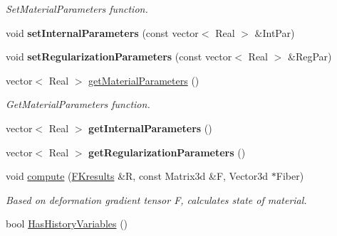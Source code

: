 \begin{DoxyCompactItemize}
\begin{DoxyCompactList}\small\item\em SetMaterialParameters function. \item\end{DoxyCompactList}\item 
\hypertarget{classvoom_1_1_pass_myo_a_a413a68f64bd4b31f7f31762b371ce168}{
void {\bfseries setInternalParameters} (const vector$<$ Real $>$ \&IntPar)}
\label{classvoom_1_1_pass_myo_a_a413a68f64bd4b31f7f31762b371ce168}

\item 
\hypertarget{classvoom_1_1_pass_myo_a_afd21cbc27fb5bdb9c13b476fb9d31e71}{
void {\bfseries setRegularizationParameters} (const vector$<$ Real $>$ \&RegPar)}
\label{classvoom_1_1_pass_myo_a_afd21cbc27fb5bdb9c13b476fb9d31e71}

\item 
\hypertarget{classvoom_1_1_pass_myo_a_a63cdaa267f12644f0bfb370e8edb437a}{
vector$<$ Real $>$ \hyperlink{classvoom_1_1_pass_myo_a_a63cdaa267f12644f0bfb370e8edb437a}{getMaterialParameters} ()}
\label{classvoom_1_1_pass_myo_a_a63cdaa267f12644f0bfb370e8edb437a}

\begin{DoxyCompactList}\small\item\em GetMaterialParameters function. \item\end{DoxyCompactList}\item 
\hypertarget{classvoom_1_1_pass_myo_a_a8c64a85541b9b3d7ddfbc2af457c6f7d}{
vector$<$ Real $>$ {\bfseries getInternalParameters} ()}
\label{classvoom_1_1_pass_myo_a_a8c64a85541b9b3d7ddfbc2af457c6f7d}

\item 
\hypertarget{classvoom_1_1_pass_myo_a_a21875f4e7fcc512d2a7d1e82d9528d02}{
vector$<$ Real $>$ {\bfseries getRegularizationParameters} ()}
\label{classvoom_1_1_pass_myo_a_a21875f4e7fcc512d2a7d1e82d9528d02}

\item 
\hypertarget{classvoom_1_1_pass_myo_a_a84ba0b39e64dd29fbb3790c3857fcb2d}{
void \hyperlink{classvoom_1_1_pass_myo_a_a84ba0b39e64dd29fbb3790c3857fcb2d}{compute} (\hyperlink{structvoom_1_1_mechanics_material_1_1_f_kresults}{FKresults} \&R, const Matrix3d \&F, Vector3d $\ast$Fiber)}
\label{classvoom_1_1_pass_myo_a_a84ba0b39e64dd29fbb3790c3857fcb2d}

\begin{DoxyCompactList}\small\item\em Based on deformation gradient tensor F, calculates state of material. \item\end{DoxyCompactList}\item 
\hypertarget{classvoom_1_1_pass_myo_a_a06cf31fdeb3e84c3aa7553928bcf3b01}{
bool \hyperlink{classvoom_1_1_pass_myo_a_a06cf31fdeb3e84c3aa7553928bcf3b01}{HasHistoryVariables} ()}
\label{classvoom_1_1_pass_myo_a_a06cf31fdeb3e84c3aa7553928bcf3b01}


\end{DoxyCompactItemize}
